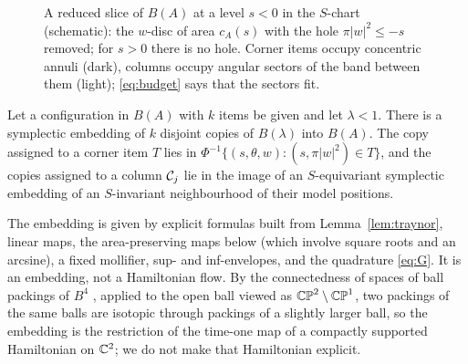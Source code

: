 \documentclass[11pt]{amsart}
\begin{document}
\begin{figure}[t]
\begin{minipage}[c]{0.5\textwidth}
\centering
{}
\end{minipage}\hfill
\begin{minipage}[c]{0.47\textwidth}
\caption{A reduced slice of $B(A)$ at a level $s<0$ in the $S$-chart (schematic): the $w$-disc of area $c_A(s)$
with the hole $\pi|w|^2\le-s$ removed; for $s>0$ there is no hole. Corner items occupy concentric annuli (dark),
columns occupy angular sectors of the band between them (light); \eqref{eq:budget} says that the sectors fit.}
\label{fig:slice}
\end{minipage}
\end{figure}

\begin{theorem}[Realisation]\label{thm:realise}
Let a configuration in $B(A)$ with $k$ items be given and let $\lambda<1$. There is a symplectic embedding of $k$
disjoint copies of $B(\lambda)$ into $B(A)$. The copy assigned to a corner item $T$ lies in
$\Phi^{-1}\{(s,\theta,w):(s,\pi|w|^2)\in T\}$, and the copies assigned to a column $\mathcal{C}_j$ lie in the image of an
$S$-equivariant symplectic embedding of an $S$-invariant neighbourhood of their model positions.
\end{theorem}

The embedding is given by explicit formulas built from Lemma~\ref{lem:traynor}, linear maps, the
area-preserving maps below (which involve square roots and an arcsine), a fixed mollifier, sup- and
inf-envelopes, and the quadrature \eqref{eq:G}. It is an embedding, not a Hamiltonian flow. By the connectedness of spaces of ball packings of $B^4$ \cite{McDuff1998}, applied to the open ball
viewed as $\mathbb{CP}^2\setminus\mathbb{CP}^1$, two packings of the same balls are isotopic through packings of a slightly larger
ball, so the embedding is the restriction of the time-one map of a compactly supported Hamiltonian on $\mathbb{C}^2$; we do
not make that Hamiltonian explicit.
\end{document}
